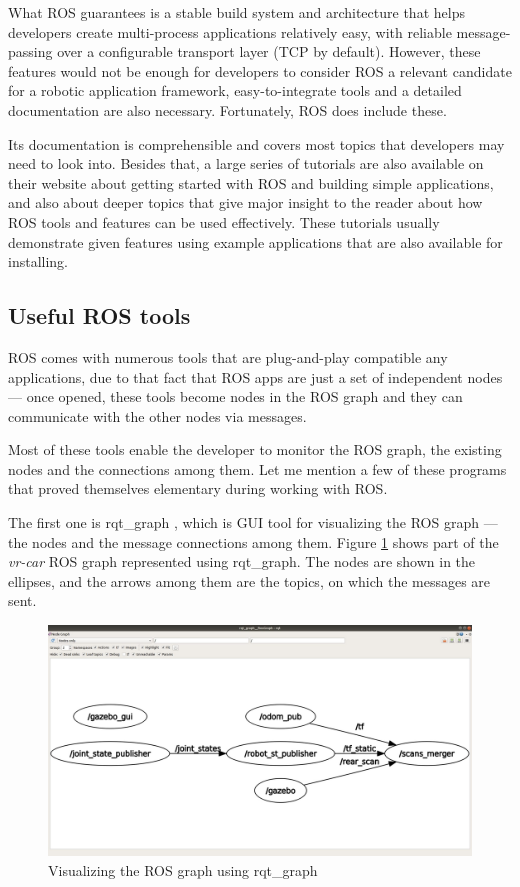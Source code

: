 What ROS guarantees is a stable build system and architecture that helps developers create multi-process applications relatively easy, with reliable message-passing over a configurable transport layer (TCP by default). However, these features would not be enough for developers to consider ROS a relevant candidate for a robotic application framework, easy-to-integrate tools and a detailed documentation are also necessary. Fortunately, ROS does include these.

Its documentation is comprehensible and covers most topics that developers may need to look into. Besides that, a large series of tutorials are also available on their website about getting started with ROS and building simple applications, and also about deeper topics that give major insight to the reader about how ROS tools and features can be used effectively. These tutorials usually demonstrate given features using example applications that are also available for installing.

\subsection{Useful ROS tools}
ROS comes with numerous tools that are plug-and-play compatible any applications, due to that fact that ROS apps are just a set of independent nodes --- once opened, these tools become nodes in the ROS graph and they can communicate with the other nodes via messages.

Most of these tools enable the developer to monitor the ROS graph, the existing nodes and the connections among them. Let me mention a few of these programs that proved themselves elementary during working with ROS.

The first one is rqt\_graph \cite{ros_rqt_graph}, which is GUI tool for visualizing the ROS graph --- the nodes and the message connections among them. Figure \ref{rqt_graph} shows part of the \textit{vr-car} ROS graph represented using rqt\_graph. The nodes are shown in the ellipses, and the arrows among them are the topics, on which the messages are sent.

\begin{figure}[!ht]
	\centering
	\includegraphics[width=\textwidth]{figures/raw/jpeg/rqt_graph.jpg}
	\caption{Visualizing the ROS graph using rqt\_graph}
	\label{rqt_graph}
\end{figure}

